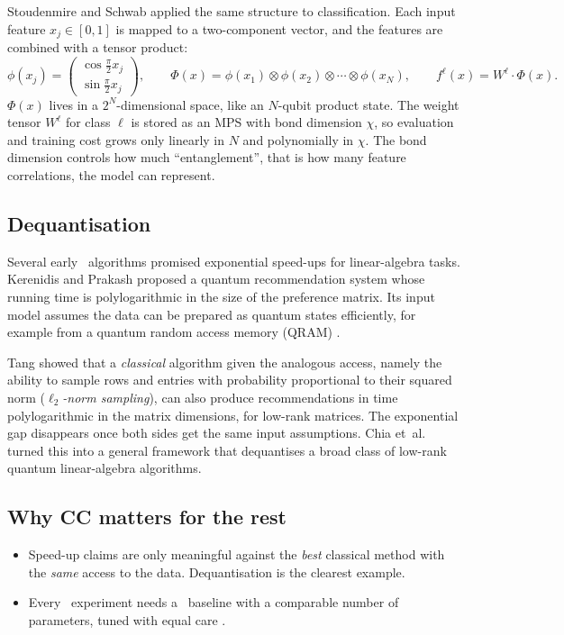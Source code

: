 \documentclass[11pt,a4paper]{article}
\begin{document}
Stoudenmire and Schwab \citeyearpar{stoudenmire2016} applied the same structure to classification. Each
input feature $x_j\in[0,1]$ is mapped to a two-component vector, and the features are combined with a
tensor product:
\begin{equation}
  \phi(x_j)=\begin{pmatrix}\cos\frac{\pi}{2}x_j\\[2pt] \sin\frac{\pi}{2}x_j\end{pmatrix},\qquad
  \Phi(x)=\phi(x_1)\otimes\phi(x_2)\otimes\cdots\otimes\phi(x_N),\qquad
  f^{\ell}(x)=W^{\ell}\cdot\Phi(x).
\end{equation}
$\Phi(x)$ lives in a $2^N$-dimensional space, like an $N$-qubit product state. The weight tensor
$W^\ell$ for class $\ell$ is stored as an MPS with bond dimension $\chi$, so evaluation and training
cost grows only linearly in $N$ and polynomially in $\chi$. The bond dimension controls how much
``entanglement'', that is how many feature correlations, the model can represent.

\subsection{Dequantisation}
Several early \CQ\ algorithms promised exponential speed-ups for linear-algebra tasks. Kerenidis and
Prakash \citeyearpar{kerenidis2017} proposed a quantum recommendation system whose running time is
polylogarithmic in the size of the preference matrix. Its input model assumes the data can be
prepared as quantum states efficiently, for example from a quantum random access memory
(QRAM) \citep{giovannetti2008qram}.

Tang \citeyearpar{tang2019} showed that a \emph{classical} algorithm given the analogous access, namely the
ability to sample rows and entries with probability proportional to their squared norm
(\emph{$\ell_2$-norm sampling}), can also produce recommendations in time polylogarithmic in the
matrix dimensions, for low-rank matrices. The exponential gap disappears once both sides get the
same input assumptions. Chia et~al. \citeyearpar{chia2022} turned this into a general framework that
dequantises a broad class of low-rank quantum linear-algebra algorithms.

\subsection{Why CC matters for the rest}
\begin{itemize}
  \item Speed-up claims are only meaningful against the \emph{best} classical method with the
        \emph{same} access to the data. Dequantisation is the clearest example.
  \item Every \CQ\ experiment needs a \CC\ baseline with a comparable number of parameters,
        tuned with equal care \citep{bowles2024}.
\end{itemize}
\end{document}
